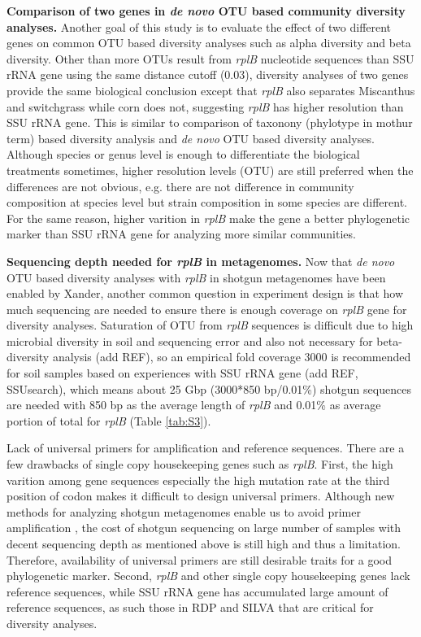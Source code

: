 \documentclass[]{msu-thesis}
\begin{document}
\textbf{Comparison of two genes in \textit{de novo} OTU based community diversity analyses. }
Another goal of this study is to evaluate the effect of two different genes on common OTU based diversity analyses such as alpha diversity and beta diversity. Other than more OTUs result from \textit{rplB} nucleotide sequences than SSU rRNA gene using the same distance cutoff (0.03), diversity analyses of two genes provide the same biological conclusion except that \textit{rplB} also separates Miscanthus and switchgrass while corn does not, suggesting \textit{rplB} has higher resolution than SSU rRNA gene. This is similar to comparison of taxonony (phylotype in mothur term) based diversity analysis and \textit{de novo} OTU based diversity analyses. Although species or genus level is enough to differentiate the biological treatments sometimes, higher resolution levels (OTU) are still preferred when the differences are not obvious, e.g. there are not difference in community composition at species level but strain composition in some species are different. For the same reason, higher varition in \textit{rplB} make the gene a better phylogenetic marker than SSU rRNA gene for analyzing more similar communities.

\textbf{Sequencing depth needed for \textit{rplB} in metagenomes. }
Now that \textit{de novo} OTU based diversity analyses with \textit{rplB} in shotgun metagenomes have been enabled by Xander, another common question in experiment design is that how much sequencing are needed to ensure there is enough coverage on \textit{rplB} gene for diversity analyses. Saturation of OTU from \textit{rplB} sequences is difficult due to high microbial diversity in soil and sequencing error and also not necessary for beta-diversity analysis (add REF), so an empirical fold coverage 3000 is recommended for soil samples based on experiences with SSU rRNA gene (add REF, SSUsearch), which means about 25 Gbp (3000*850 bp/0.01\%) shotgun sequences are needed with 850 bp as the average length of \textit{rplB} and 0.01\% as average portion of total for \textit{rplB} (Table \ref{tab:S3}).

{Lack of universal primers for amplification and reference sequences. }
There are a few drawbacks of single copy housekeeping genes such as \textit{rplB}. First, the high varition among gene sequences especially the high mutation rate at the third position of codon makes it difficult to design universal primers. Although new methods for analyzing shotgun metagenomes enable us to avoid primer amplification \cite{guo_microbial_2015,wang_xander:_2015,miller_short-read_2013}, the cost of shotgun sequencing on large number of samples with decent sequencing depth as mentioned above is still high and thus a limitation. Therefore, availability of universal primers are still desirable traits for a good phylogenetic marker. Second, \textit{rplB} and other single copy housekeeping genes lack reference sequences, while SSU rRNA gene has accumulated large amount of reference sequences, as such those in RDP and SILVA \cite{cole_ribosomal_2014,quast_silva_2013} that are critical for diversity analyses.
\end{document}
